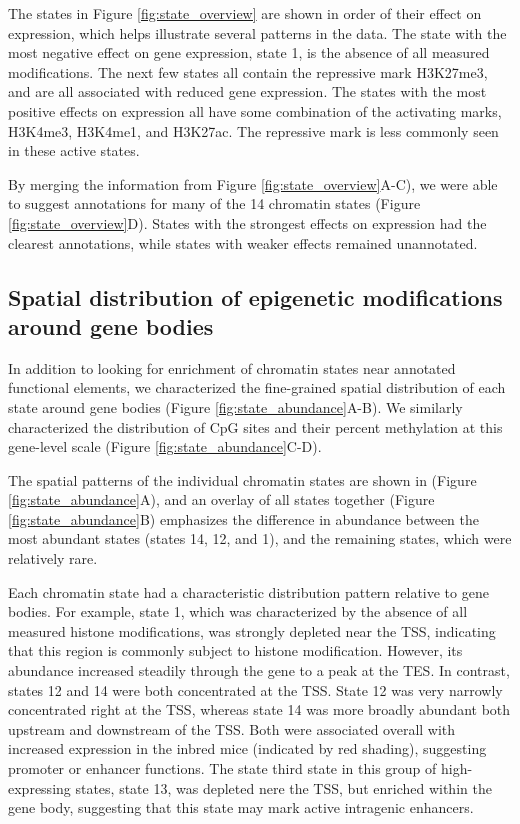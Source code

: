 \documentclass[10pt,letterpaper]{article}
\begin{document}
The states in Figure \ref{fig:state_overview} are shown in order of
their effect on expression, which helps illustrate several patterns in
the data. The state with the most negative effect on gene expression,
state 1, is the absence of all measured modifications. The next few
states all contain the repressive mark H3K27me3, and are all associated
with reduced gene expression. The states with the most positive effects
on expression all have some combination of the activating marks,
H3K4me3, H3K4me1, and H3K27ac. The repressive mark is less commonly seen
in these active states.

By merging the information from Figure \ref{fig:state_overview}A-C), we
were able to suggest annotations for many of the 14 chromatin states
(Figure \ref{fig:state_overview}D). States with the strongest effects on
expression had the clearest annotations, while states with weaker
effects remained unannotated.

\hypertarget{spatial-distribution-of-epigenetic-modifications-around-gene-bodies}{%
\subsection{Spatial distribution of epigenetic modifications around gene
bodies}\label{spatial-distribution-of-epigenetic-modifications-around-gene-bodies}}

In addition to looking for enrichment of chromatin states near annotated
functional elements, we characterized the fine-grained spatial
distribution of each state around gene bodies (Figure
\ref{fig:state_abundance}A-B). We similarly characterized the
distribution of CpG sites and their percent methylation at this
gene-level scale (Figure \ref{fig:state_abundance}C-D).

The spatial patterns of the individual chromatin states are shown in
(Figure \ref{fig:state_abundance}A), and an overlay of all states
together (Figure \ref{fig:state_abundance}B) emphasizes the difference
in abundance between the most abundant states (states 14, 12, and 1),
and the remaining states, which were relatively rare.

Each chromatin state had a characteristic distribution pattern relative
to gene bodies. For example, state 1, which was characterized by the
absence of all measured histone modifications, was strongly depleted
near the TSS, indicating that this region is commonly subject to histone
modification. However, its abundance increased steadily through the gene
to a peak at the TES. In contrast, states 12 and 14 were both
concentrated at the TSS. State 12 was very narrowly concentrated right
at the TSS, whereas state 14 was more broadly abundant both upstream and
downstream of the TSS. Both were associated overall with increased
expression in the inbred mice (indicated by red shading), suggesting
promoter or enhancer functions. The state third state in this group of
high-expressing states, state 13, was depleted nere the TSS, but
enriched within the gene body, suggesting that this state may mark
active intragenic enhancers.
\end{document}
